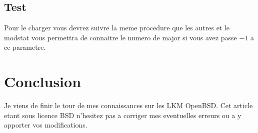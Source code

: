 \documentclass[a4paper, 11pt]{article}
\begin{document}
\subsection{Test}
Pour le charger vous devrez suivre la meme procedure que les autres et le
modstat vous permettra de connaitre le numero de major si vous avez passe $-1$
a ce parametre.
\newline
\section{Conclusion}
Je viens de finir le tour de mes connaissances sur les LKM OpenBSD. Cet article
etant sous licence BSD n'hesitez pas a corriger mes eventuelles erreurs ou a y
apporter vos modifications.
\end{document}
